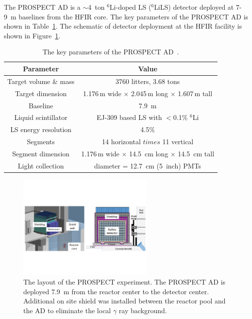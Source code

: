     The PROSPECT AD is a $\sim$4~ton $^{6}$Li-doped LS ($^{6}$LiLS) detector deployed at 7-9~m baselines from the HFIR core.
    The key parameters of the PROSPECT AD is shown in Table~\ref{tab:PROSPECT_AD}.
    The schematic of detector deployment at the HFIR facility is shown in Figure~\ref{fig:PROSPECT_LAYOUT}.
\begin{table}[h]
    \centering
    \caption[PROSPECT AD Parameters]{The key parameters of the PROSPECT AD~\cite{bib:prospect_nim}.}
    \begin{tabular}{cc}
    \hline
    \hline
    Parameter  & Value   \\ 
    \hline
    Target volume \& mass    & 3760 litters, 3.68 tons\\
    Target dimension & 1.176\,m wide $\times$ 2.045\,m long  $\times$ 1.607\,m tall \\
    Baseline     & 7.9~m \\
    Liquid scintillator & EJ-309 based LS with $<$0.1\% $^{6}$Li \\
    LS energy resolution & 4.5\% \\
    Segments & 14 horizontal $times$ 11 vertical \\
    Segment dimension & 1.176\,m wide $\times$ 14.5~cm long  $\times$ 14.5~cm tall \\
    Light collection & diameter = 12.7~cm (5~inch) PMTs\\
    \hline
    \end{tabular}
    \label{tab:PROSPECT_AD}
\end{table}
\begin{figure}
    \centering
    \includegraphics[width=0.6\textwidth]{Figures/Layout.pdf}
    \caption[The layout of the PROSPECT experiment]{The layout of the PROSPECT experiment.
    The PROSPECT AD is deployed 7.9~m from the reactor center to the detector center.
    Additional on site shield was installed between the reactor pool and the AD to eliminate the local $\gamma$ ray background.
    }
    \label{fig:PROSPECT_LAYOUT}
\end{figure}
    
